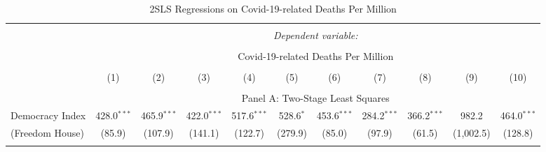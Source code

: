 
\begin{table}[!htbp] \centering
  \caption{2SLS Regressions on Covid-19-related Deaths Per Million}
  \label{tab:2sls-deaths-gdp-weighting} 
  \footnotesize
  \begin{threeparttable}
\begin{tabular}{@{\extracolsep{0pt}}lcccccccccc} 
\\[-1.8ex]\hline 
\hline \\[-1.8ex] 
 & \multicolumn{10}{c}{\textit{Dependent variable:}} \\ 
\cline{2-11} 
\\[-1.8ex] & \multicolumn{10}{c}{Covid-19-related Deaths Per Million} \\ 
\\[-1.8ex] & (1) & (2) & (3) & (4) & (5) & (6) & (7) & (8) & (9) & (10)\\ 
\hline \\[-1.8ex] 
  & \multicolumn{10}{c}{Panel A: Two-Stage Least Squares} \\
Democracy Index & 428.0$^{***}$ & 465.9$^{***}$ & 422.0$^{***}$ & 517.6$^{***}$ & 528.6$^{*}$ & 453.6$^{***}$ & 284.2$^{***}$ & 366.2$^{***}$ & 982.2 & 464.0$^{***}$ \\ 
(Freedom House)  & (85.9) & (107.9) & (141.1) & (122.7) & (279.9) & (85.0) & (97.9) & (61.5) & (1,002.5) & (128.8) \\  
\hline \\[-1.8ex] 



\end{tabular}
\end{threeparttable}
\end{table}

